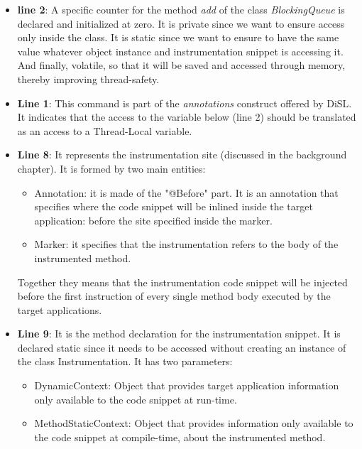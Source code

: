 \documentclass[]{usiinfthesis}
\begin{document}
\begin{itemize}
    \item \textbf{line 2}: A specific counter for the method \textit{add} of the class \textit{BlockingQueue} is declared and initialized at zero. It is private since we want to ensure access only inside the class. It is static since we want to ensure to have the same value whatever object instance and instrumentation snippet is accessing it. And finally, volatile, so that it will be saved and accessed through memory, thereby improving thread-safety. 
    
    \item \textbf{Line 1}: This command is part of the \textit{annotations} construct offered by DiSL. It indicates that the access to the variable below (line 2) should be translated as an access to a Thread-Local variable.
    
    \item \textbf{Line 8}: It represents the instrumentation site (discussed in the background chapter). It is formed by two main entities:
    \begin{itemize}
        \item Annotation: it is made of the "@Before" part. It is an annotation that specifies where the code snippet will be inlined inside the target application: before the site specified inside the marker.
        \item Marker: it specifies that the instrumentation refers to the body of the instrumented method.
    \end{itemize}
    Together they means that the instrumentation code snippet will be injected before the first instruction of every single method body executed by the target applications.
    
    \item \textbf{Line 9}: It is the method declaration for the instrumentation snippet. It is declared static since it needs to be accessed without creating an instance of the class Instrumentation. It has two parameters:
    \begin{itemize}
        \item DynamicContext: Object that provides target application information only available to the code snippet at run-time.
        \item MethodStaticContext: Object that provides information only available to the code snippet at compile-time, about the instrumented method.
    \end{itemize}
    

\end{itemize}
\end{document}
